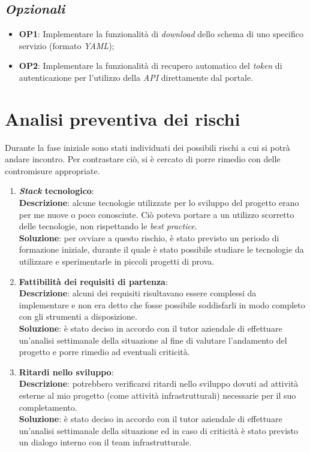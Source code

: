 \subsection*{\emph{Opzionali}}\label{subsec:obiettivi-opzionali}
\begin{itemize}
    \item \textbf{OP1}: Implementare la funzionalità di \textit{download} dello schema di uno specifico servizio (formato \textit{YAML});
    \item \textbf{OP2}: Implementare la funzionalità di recupero automatico del \textit{token} di autenticazione per l'utilizzo della \textit{API} direttamente dal portale.
\end{itemize}

\section{Analisi preventiva dei rischi}\label{sec:analisi-rischi}
Durante la fase iniziale sono stati individuati dei possibili rischi a cui si potrà andare incontro. Per contrastare ciò, si è cercato di porre rimedio con delle contromisure appropriate.
\begin{enumerate}
    \item \textbf{\textit{Stack} tecnologico}:\\
        \textbf{Descrizione}: alcune tecnologie utilizzate per lo sviluppo del progetto erano per me nuove o poco conosciute. Ciò poteva portare a un utilizzo scorretto delle tecnologie, non rispettando le \textit{best practice}.\\
        \textbf{Soluzione}: per ovviare a questo rischio, è stato previsto un periodo di formazione iniziale, durante il quale è stato possibile studiare le tecnologie da utilizzare e sperimentarle in piccoli progetti di prova.\\
    \item \textbf{Fattibilità dei requisiti di partenza}:\\
        \textbf{Descrizione}: alcuni dei requisiti risultavano essere complessi da implementare e non era detto che fosse possibile soddisfarli in modo completo con gli strumenti a disposizione.\\
        \textbf{Soluzione}: è stato deciso in accordo con il tutor aziendale di effettuare un'analisi settimanale della situazione al fine di valutare l'andamento del progetto e porre rimedio ad eventuali criticità.\\ 
    \item \textbf{Ritardi nello sviluppo}:\\
        \textbf{Descrizione}: potrebbero verificarsi ritardi nello sviluppo dovuti ad attività esterne al mio progetto (come attività infrastrutturali) necessarie per il suo completamento.\\
        \textbf{Soluzione}: è stato deciso in accordo con il tutor aziendale di effettuare un'analisi settimanale della situazione ed in caso di criticità è stato previsto un dialogo interno con il team infrastrutturale.\\
\end{enumerate}